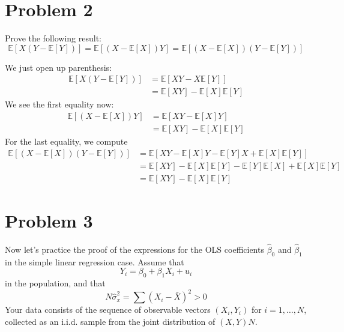\documentclass[11pt]{article}
\newcommand{\bbE}{\mathbb{E}}
\begin{document}
\newpage
\section*{Problem 2}

Prove the following result:
\[
\mathbb{E}[X(Y - \mathbb{E}[Y])] = \mathbb{E}[(X - \mathbb{E}[X])Y] = \mathbb{E}[(X - \mathbb{E}[X])(Y - \mathbb{E}[Y])]
\]
\begin{solution}
    We just open up parenthesis:
    \begin{align*}
        \bbE[X(Y - \bbE[Y])] &= \bbE[XY - X\bbE[Y]]\\
        &= \bbE[XY] - \bbE[X]\bbE[Y]
    \end{align*}
    We see the first equality now:
    \begin{align*}
        \bbE[(X - \bbE[X])Y] &= \bbE[XY- \bbE[X]Y]\\
        &= \bbE[XY] - \bbE[X]\bbE[Y]
    \end{align*}
    For the last equality, we compute
    \begin{align*}
        \bbE[(X - \bbE[X])(Y - \bbE[Y])] &= \bbE[XY - \bbE[X]Y - \bbE[Y]X + \bbE[X]\bbE[Y]]\\
        &= \bbE[XY] - \bbE[X]\bbE[Y] - \bbE[Y]\bbE[X] + \bbE[X]\bbE[Y]\\
        &= \bbE[XY] - \bbE[X]\bbE[Y]
    \end{align*}
\end{solution}

\newpage
\section*{Problem 3}

Now let’s practice the proof of the expressions for the OLS coefficients \( \hat{\beta}_0 \) and \( \hat{\beta}_1 \) in the simple linear regression case. Assume that
\[
Y_i = \beta_0 + \beta_1 X_i + u_i
\]
in the population, and that
\[
N \hat{\sigma}_x^2 = \sum (X_i - \bar{X})^2 > 0
\]
Your data consists of the sequence of observable vectors \( (X_i, Y_i) \) for \( i = 1, \dots, N \), collected as an i.i.d. sample from the joint distribution of \( (X, Y) N\).
\end{document}
